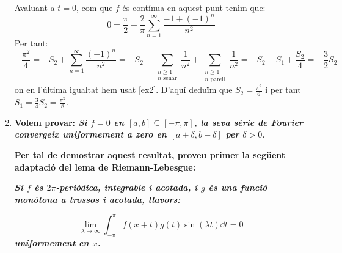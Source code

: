 \documentclass[10pt,a4paper]{article}
\theoremstyle{definition}
\begin{document}
\begin{enumerate}
        Avaluant a $t=0$, com que $f$ és contínua en aquest punt tenim que:
        $$0=\frac{\pi}{2}+\frac{2}{\pi}\sum_{n=1}^\infty\frac{-1+{(-1)}^n}{n^2}$$
        Per tant:
        $$-\frac{\pi^2}{4}=-S_2+\sum_{n=1}^{\infty}\frac{{(-1)}^n}{n^2}=-S_2-\sum_{\substack{n\geq 1\\n\text{ senar}}}\frac{1}{n^2}+\sum_{\substack{n\geq 1\\n\text{ parell}}}\frac{1}{n^2}=-S_2-S_1+\frac{S_2}{4}=-\frac{3}{2}S_2$$
        on en l'última igualtat hem usat \eqref{ex2}. D'aquí deduïm que $S_2=\frac{\pi^2}{6}$ i per tant $S_1=\frac{3}{4}S_2=\frac{\pi^2}{8}$.
        \item\textbf{Volem provar: \textit{Si $f=0$ en $[a,b]\subseteq[-\pi,\pi]$, la seva sèrie de Fourier convergeix uniformement a zero en $[a+\delta,b-\delta]$ per $\delta>0$.}}

        \textbf{Per tal de demostrar aquest resultat, proveu primer la següent adaptació del lema de Riemann-Lebesgue:}

        \textbf{\textit{Si $f$ és $2\pi$-periòdica, integrable i acotada, i $g$ és una funció monòtona a trossos i acotada, llavors:}}

        $$\lim_{\lambda\to\infty}\int_{-\pi}^{\pi}f(x+t)g(t)\sin(\lambda t)\dd{t}=0$$
        \textbf{\textit{uniformement en $x$.}}


\end{enumerate}
\end{document}
